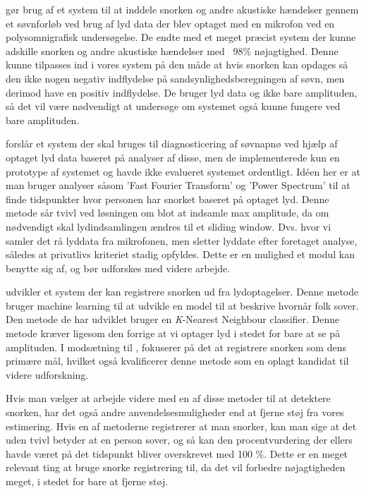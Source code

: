 \citet{Dafna2013} gør brug af et system til at inddele snorken og andre akustiske hændelser gennem et søvnforløb ved brug af lyd data der blev optaget med en mikrofon ved en polysomnigrafisk undersøgelse. 
De endte med et meget præcist system der kunne adskille snorken og andre akustiske hændelser med ~98\% nøjagtighed.
Denne kunne tilpasses ind i vores system på den måde at hvis snorken kan opdages så den ikke nogen negativ indflydelse på sandsynlighedsberegningen af søvn, men derimod have en positiv indflydelse. 
De bruger lyd data og ikke bare amplituden, så det vil være nødvendigt at undersøge om systemet også kunne fungere ved bare amplituden.

\citet{Calabrese20111101} forslår et system der skal bruges til diagnosticering af søvnapnø ved hjælp af optaget lyd data baseret på analyser af disse, men de implementerede kun en prototype af systemet og havde ikke evalueret systemet ordentligt. 
Idéen her er at man bruger analyser såsom 'Fast Fourier Transform' og 'Power Spectrum' til at finde tidspunkter hvor personen har snorket baseret på optaget lyd. 
Denne metode sår tvivl ved løsningen om blot at indsamle max amplitude, da om nødvendigt skal lydindsamlingen ændres til et sliding window.
Dvs. hvor vi samler det rå lyddata fra mikrofonen, men sletter lyddate efter foretaget analyse, således at privatlivs kriteriet stadig opfyldes.
Dette er en mulighed et modul kan benytte sig af, og bør udforskes med videre arbejde.

\citet{7051338} udvikler et system der kan registrere snorken ud fra lydoptagelser.
Denne metode bruger machine learning til at udvikle en model til at beskrive hvornår folk sover.
Den metode de har udviklet bruger en \textit{K}-Nearest Neighbour classifier.
Denne metode kræver ligesom den forrige at vi optager lyd i stedet for bare at se på amplituden.
I modsætning til \citet{Calabrese20111101}, fokuserer \citet{7051338} på det at registrere snorken som dens primære mål, hvilket også kvalificerer denne metode som en oplagt kandidat til videre udforskning.

Hvis man vælger at arbejde videre med en af disse metoder til at detektere snorken, har det også andre anvendelsesmuligheder end at fjerne støj fra vores estimering.
Hvis en af metoderne registrerer at man snorker, kan man sige at det uden tvivl betyder at en person sover, og så kan den procentvurdering der ellers havde været på det tidspunkt bliver overskrevet med 100 \%.
Dette er en meget relevant ting at bruge snorke registrering til, da det vil forbedre nøjagtigheden meget, i stedet for bare at fjerne støj.
